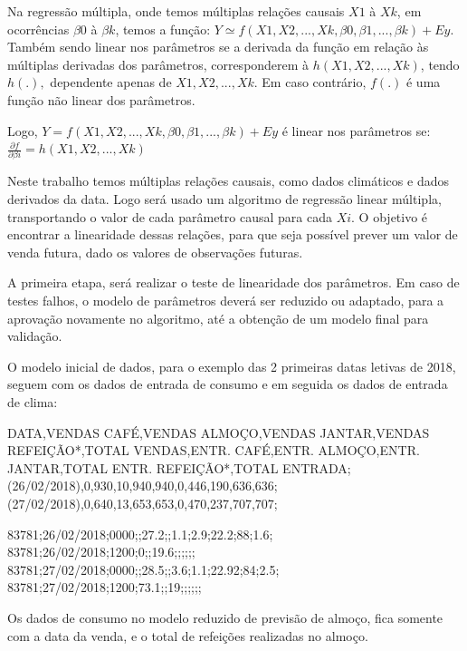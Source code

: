 \documentclass[	12pt, Times, openright, twoside, a4paper, english, brazil]{abntex2}
\begin{document}
          Na regressão múltipla, onde temos múltiplas relações causais $X1$ à $X k$, em ocorrências $\beta 0$ à $\beta k$, temos a função: $Y \simeq f(X1, X2, ..., X k, \beta0, \beta1, ..., \beta k) + E y$. Também sendo linear nos parâmetros se a derivada da função em relação às múltiplas derivadas dos parâmetros, corresponderem à $h(X1,X2,...,X k)$, tendo $h(.),$ dependente apenas de $X1,X2,...,X k$. Em caso contrário, $f(.)$ é uma função não linear dos parâmetros.

          Logo, $Y=f(X1,X2,...,X k,\beta0,\beta1,...,\beta k)+E y$ é linear nos parâmetros se:
          $\frac {\partial f}{\partial \beta i} = h(X1,X2,...,X k)$

          Neste trabalho temos múltiplas relações causais, como dados climáticos e dados derivados da data. Logo será usado um algoritmo de regressão linear múltipla, transportando o valor de cada parâmetro causal para cada $Xi$.
          O objetivo é encontrar a linearidade dessas relações, para que seja possível prever um valor de venda futura, dado os valores de observações futuras.

          A primeira etapa, será realizar o teste de linearidade dos parâmetros. Em caso de testes falhos, o modelo de parâmetros deverá ser reduzido ou adaptado, para a aprovação novamente no algoritmo, até a obtenção de um modelo final para validação.

          O modelo inicial de dados, para o exemplo das 2 primeiras datas letivas de 2018, seguem com os dados de entrada de consumo e em seguida os dados de entrada de clima: 
          \begin{algorithm}
          DATA,VENDAS CAFÉ,VENDAS ALMOÇO,VENDAS JANTAR,VENDAS REFEIÇÃO*,TOTAL VENDAS,ENTR. CAFÉ,ENTR. ALMOÇO,ENTR. JANTAR,TOTAL ENTR. REFEIÇÃO*,TOTAL ENTRADA;
          (26/02/2018),0,930,10,940,940,0,446,190,636,636;
          (27/02/2018),0,640,13,653,653,0,470,237,707,707;   
          \end{algorithm}

          \begin{algorithm}
          83781;26/02/2018;0000;;27.2;;1.1;2.9;22.2;88;1.6;
          83781;26/02/2018;1200;0;;19.6;;;;;;
          83781;27/02/2018;0000;;28.5;;3.6;1.1;22.92;84;2.5;
          83781;27/02/2018;1200;73.1;;19;;;;;;   
          \end{algorithm}

          Os dados de consumo no modelo reduzido de previsão de almoço, fica somente com a data da venda, e o total de refeições realizadas no almoço.
\end{document}
